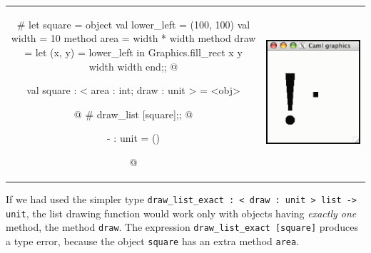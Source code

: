 \begin{center}
\begin{tabular}{cc}
\begin{minipage}[b]{3in}
\begin{ocamllistingx}
# let square =
  object
     val lower_left = (100, 100)
     val width = 10
     method area = width * width
     method draw =
        let (x, y) = lower_left in
        Graphics.fill_rect x y width width
  end;;
@
\begin{topoutput}
val square : < area : int; draw : unit > = <obj>
\end{topoutput}
@
# draw_list [square];;
@
\begin{topoutput}
- : unit = ()
\end{topoutput}
@
\end{ocamllistingx}
\end{minipage}
&
\includegraphics[scale=0.3]{graphics1a}
\end{tabular}
\end{center}
%
If we had used the simpler type \hbox{\lstinline/draw_list_exact : < draw : unit > list -> unit/}, the list
drawing function would work only with objects having \emph{exactly one} method, the
method \hbox{\lstinline/draw/}.  The expression \hbox{\lstinline/draw_list_exact [square]/} produces a type error,
because the object \hbox{\lstinline/square/} has an extra method \hbox{\lstinline/area/}.

